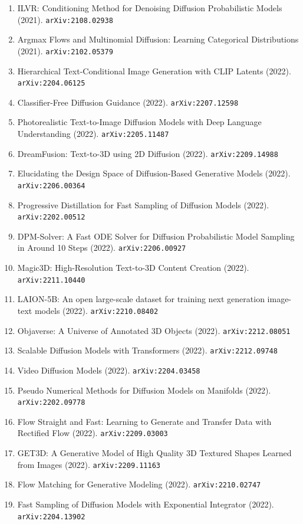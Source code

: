 \documentclass[11pt]{article}
\begin{document}
\begin{enumerate}
  \item ILVR: Conditioning Method for Denoising Diffusion Probabilistic Models (2021). \texttt{arXiv:2108.02938}
  \item Argmax Flows and Multinomial Diffusion: Learning Categorical
  Distributions (2021). \texttt{arXiv:2102.05379}
  \item Hierarchical Text-Conditional Image Generation with CLIP Latents (2022). \texttt{arXiv:2204.06125}
  \item Classifier-Free Diffusion Guidance (2022). \texttt{arXiv:2207.12598}
  \item Photorealistic Text-to-Image Diffusion Models with Deep Language
  Understanding (2022). \texttt{arXiv:2205.11487}
  \item DreamFusion: Text-to-3D using 2D Diffusion (2022). \texttt{arXiv:2209.14988}
  \item Elucidating the Design Space of Diffusion-Based Generative Models (2022). \texttt{arXiv:2206.00364}
  \item Progressive Distillation for Fast Sampling of Diffusion Models (2022). \texttt{arXiv:2202.00512}
  \item DPM-Solver: A Fast ODE Solver for Diffusion Probabilistic Model Sampling
  in Around 10 Steps (2022). \texttt{arXiv:2206.00927}
  \item Magic3D: High-Resolution Text-to-3D Content Creation (2022). \texttt{arXiv:2211.10440}
  \item LAION-5B: An open large-scale dataset for training next generation
  image-text models (2022). \texttt{arXiv:2210.08402}
  \item Objaverse: A Universe of Annotated 3D Objects (2022). \texttt{arXiv:2212.08051}
  \item Scalable Diffusion Models with Transformers (2022). \texttt{arXiv:2212.09748}
  \item Video Diffusion Models (2022). \texttt{arXiv:2204.03458}
  \item Pseudo Numerical Methods for Diffusion Models on Manifolds (2022). \texttt{arXiv:2202.09778}
  \item Flow Straight and Fast: Learning to Generate and Transfer Data with
  Rectified Flow (2022). \texttt{arXiv:2209.03003}
  \item GET3D: A Generative Model of High Quality 3D Textured Shapes Learned
  from Images (2022). \texttt{arXiv:2209.11163}
  \item Flow Matching for Generative Modeling (2022). \texttt{arXiv:2210.02747}
  \item Fast Sampling of Diffusion Models with Exponential Integrator (2022). \texttt{arXiv:2204.13902}

\end{enumerate}
\end{document}
